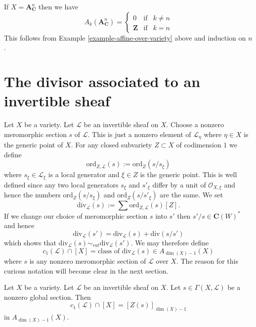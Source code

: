 \begin{example}
\label{example-affine-space}
If $X = \mathbf{A}^n_{\mathbf{C}}$ then we have
$$
A_k(\mathbf{A}^n_{\mathbf{C}}) = 
\left\{
\begin{matrix}
0 & \text{if} & k \not = n \\
\mathbf{Z} & \text{if} & k = n
\end{matrix}
\right.
$$
This follows from Example \ref{example-affine-over-variety} above
and induction on $n$.
\end{example}




\section{The divisor associated to an invertible sheaf}
\label{section-divisor-invertible-sheaf}

\noindent
Let $X$ be a variety. Let $\mathcal{L}$ be an invertible sheaf on $X$.
Choose a nonzero meromorphic section $s$ of $\mathcal{L}$. This is just 
a nonzero element of $\mathcal{L}_\eta$ where $\eta \in X$ is the generic
point of $X$. For any closed subvariety $Z \subset X$ of codimension
$1$ we define
$$
\text{ord}_{Z, \mathcal{L}}(s) :=
\text{ord}_Z(s/s_\xi)
$$
where $s_\xi \in \mathcal{L}_\xi$ is a local generator and $\xi \in Z$
is the generic point. This is well defined since any two local generators
$s_\xi$ and $s'_\xi$ differ by a unit of $\mathcal{O}_{X, \xi}$ and hence 
the numbers $\text{ord}_Z(s/s_\xi)$ and $\text{ord}_Z(s/s'_\xi)$ are the
same. We set
$$
\text{div}_{\mathcal{L}}(s) :=
\sum \text{ord}_{Z, \mathcal{L}}(s) [Z].
$$
If we change our choice of meromorphic section $s$ into $s'$
then $s'/s \in \mathbf{C}(W)^*$ and hence
$$
\text{div}_{\mathcal{L}}(s') = \text{div}_{\mathcal{L}}(s) + \text{div}(s/s')
$$
which shows that
$\text{div}_{\mathcal{L}}(s) \sim_{rat} \text{div}_{\mathcal{L}}(s')$.
We may therefore define
$$
c_1(\mathcal{L}) \cap [X] =
\text{class of }\text{div}_{\mathcal{L}}(s) \in A_{\dim(X) - 1}(X)
$$
where $s$ is any nonzero meromorphic section of $\mathcal{L}$ over
$X$. The reason for this curious notation will become clear in the
next section.

\begin{lemma}
\label{lemma-compute-c1}
Let $X$ be a variety.
Let $\mathcal{L}$ be an invertible sheaf on $X$.
Let $s \in \Gamma(X, \mathcal{L})$ be a nonzero global section.
Then
$$
c_1(\mathcal{L}) \cap [X] = [Z(s)]_{\dim(X) - 1}
$$
in $A_{\dim(X) - 1}(X)$.
\end{lemma}

